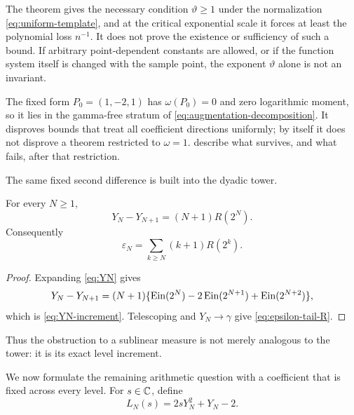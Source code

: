\begin{remark}
The theorem gives the necessary condition \(\vartheta\ge1\) under the
normalization \eqref{eq:uniform-template}, and at the critical exponential
scale it forces at least the polynomial loss \(n^{-1}\).  It does not prove
the existence or sufficiency of such a bound.  If arbitrary point-dependent
constants are allowed, or if the function system itself is changed with the
sample point, the exponent \(\vartheta\) alone is not an invariant.
\end{remark}

\begin{remark}
The fixed form \(P_0=(1,-2,1)\) has \(\omega(P_0)=0\) and zero logarithmic
moment, so it lies in the gamma-free stratum of
\eqref{eq:augmentation-decomposition}.  It disproves bounds that treat all
coefficient directions uniformly; by itself it does not disprove a theorem
restricted to \(\omega=1\).
describe what survives, and what fails, after that restriction.
\end{remark}

The same fixed second difference is built into the dyadic tower.

\begin{proposition}
\label{prop:increment-identity}
For every \(N\ge1\),
\begin{equation}\label{eq:YN-increment}
 \boxed{\displaystyle
 Y_N-Y_{N+1}=(N+1)R(2^N).}
\end{equation}
Consequently
\begin{equation}\label{eq:epsilon-tail-R}
 \varepsilon_N=\sum_{k\ge N}(k+1)R(2^k).
\end{equation}
\end{proposition}

\begin{proof}
Expanding \eqref{eq:YN} gives
\[
 Y_N-Y_{N+1}
 =(N+1)\{\operatorname{Ein}(2^N)-2\operatorname{Ein}(2^{N+1})+\operatorname{Ein}(2^{N+2})\},
\]
which is \eqref{eq:YN-increment}.  Telescoping and
\(Y_N\to\gamma\) give \eqref{eq:epsilon-tail-R}.
\end{proof}

Thus the obstruction to a sublinear measure is not merely analogous to the
tower: it is its exact level increment.

We now formulate the remaining arithmetic question with a coefficient that
is fixed across every level.  For \(s\in\mathbb C\), define
\begin{equation}\label{eq:LN-def}
 L_N(s)=2sY_N^2+Y_N-2.
\end{equation}

